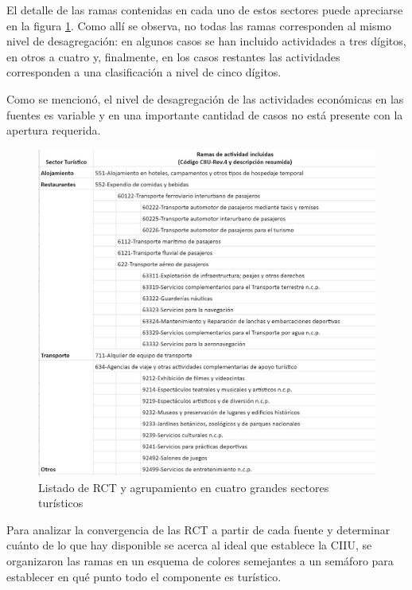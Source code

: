 \documentclass[
  openany]{book}
\begin{document}
El detalle de las ramas contenidas en cada uno de estos sectores puede apreciarse en la figura \ref{fig:empleofuentes4}. Como allí se observa, no todas las ramas corresponden al mismo nivel de desagregación: en algunos casos se han incluido actividades a tres dígitos, en otros a cuatro y, finalmente, en los casos restantes las actividades corresponden a una clasificación a nivel de cinco dígitos.

Como se mencionó, el nivel de desagregación de las actividades económicas en las fuentes es variable y en una importante cantidad de casos no está presente con la apertura requerida.

\begin{figure}

{\centering \includegraphics[width=1\linewidth]{imagenes/figura3.4} 

}

\caption{Listado de RCT y agrupamiento en cuatro grandes sectores turísticos}\label{fig:empleofuentes4}
\end{figure}

Para analizar la convergencia de las RCT a partir de cada fuente y determinar cuánto de lo que hay disponible se acerca al ideal que establece la CIIU, se organizaron las ramas en un esquema de colores semejantes a un semáforo para establecer en qué punto todo el componente es turístico.
\end{document}
